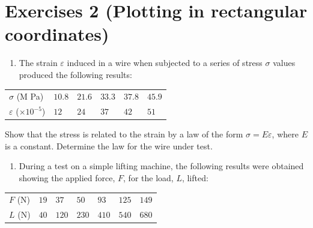 \documentclass[
  12pt,
  oneside]{book}
\providecommand{\tightlist}{%
  \setlength{\itemsep}{0pt}\setlength{\parskip}{0pt}}
\theoremstyle{definition}
\theoremstyle{definition}
\theoremstyle{definition}
\theoremstyle{definition}
\theoremstyle{remark}
\begin{document}
\hypertarget{exercises-2-plotting-in-rectangular-coordinates}{%
\chapter*{Exercises 2 (Plotting in rectangular coordinates)}\label{exercises-2-plotting-in-rectangular-coordinates}}

\begin{enumerate}
\def\labelenumi{\arabic{enumi}.}
\tightlist
\item
  The strain \(\varepsilon\) induced in a wire when subjected to a series of stress \(\sigma\) values produced the following results:
\end{enumerate}

\begin{longtable}[]{@{}
  >{\raggedright\arraybackslash}p{}
  >{\raggedright\arraybackslash}p{}
  >{\raggedright\arraybackslash}p{}
  >{\raggedright\arraybackslash}p{}
  >{\raggedright\arraybackslash}p{}
  >{\raggedright\arraybackslash}p{}@{}}
\toprule()
\endhead
\(\sigma\) (M Pa) & \(10.8\) & \(21.6\) & \(33.3\) & \(37.8\) & \(45.9\) \\
\(\varepsilon\) (\(\times 10^{-5}\)) & \(12\) & \(24\) & \(37\) & \(42\) & \(51\) \\
\bottomrule()
\end{longtable}

Show that the stress is related to the strain by a law of the form \(\sigma=E\varepsilon\), where \(E\) is a constant.
Determine the law for the wire under test.

\begin{enumerate}
\def\labelenumi{\arabic{enumi}.}
\setcounter{enumi}{1}
\tightlist
\item
  During a test on a simple lifting machine, the following results were obtained showing the
  applied force, \(F\), for the load, \(L\), lifted:
\end{enumerate}

\begin{longtable}[]{@{}
  >{\raggedright\arraybackslash}p{}
  >{\raggedright\arraybackslash}p{}
  >{\raggedright\arraybackslash}p{}
  >{\raggedright\arraybackslash}p{}
  >{\raggedright\arraybackslash}p{}
  >{\raggedright\arraybackslash}p{}
  >{\raggedright\arraybackslash}p{}@{}}
\toprule()
\endhead
\(F\) (N) & \(19\) & \(37\) & \(50\) & \(93\) & \(125\) & \(149\) \\
\(L\) (N) & \(40\) & \(120\) & \(230\) & \(410\) & \(540\) & \(680\) \\
\bottomrule()
\end{longtable}
\end{document}
